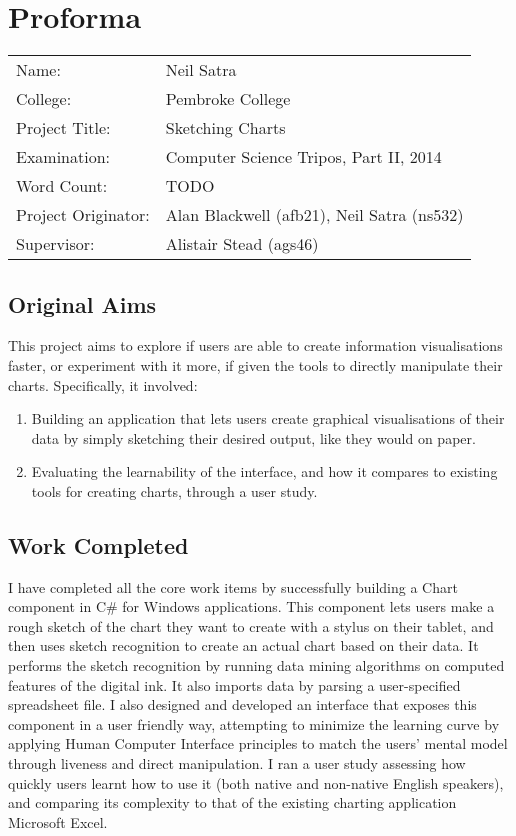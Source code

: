 \setcounter{page}{1}
\chapter*{Proforma}

\begin{tabular}{ll}
Name:               & Neil Satra					\\
College:            & Pembroke College				\\
Project Title:      & Sketching Charts				\\
Examination:        & Computer Science Tripos, Part II, 2014        \\
Word Count:         & TODO							\\
Project Originator: & Alan Blackwell (afb21), Neil Satra (ns532)        \\
Supervisor:         & Alistair Stead (ags46)				\\ 
\end{tabular}

\section*{Original Aims}
This project aims to explore if users are able to create information visualisations faster, or experiment with it more, if given the tools to directly manipulate their charts. Specifically, it involved:
\begin{enumerate}

	\item Building an application that lets users create graphical visualisations of their data by simply sketching their desired output, like they would on paper.

	\item Evaluating the learnability of the interface, and how it compares to existing tools for creating charts, through a user study.

\end{enumerate}

\section*{Work Completed}
I have completed all the core work items by successfully building a Chart component in C\# for Windows applications. This component lets users make a rough sketch of the chart they want to create with a stylus on their tablet, and then uses sketch recognition to create an actual chart based on their data. It performs the sketch recognition by running data mining algorithms on computed features of the digital ink. It also imports data by parsing a user-specified spreadsheet file. I also designed and developed an interface that exposes this component in a user friendly way, attempting to minimize the learning curve by applying Human Computer Interface principles to match the users' mental model through liveness and direct manipulation. I ran a user study assessing how quickly users learnt how to use it (both native and non-native English speakers), and comparing its complexity to that of the existing charting application Microsoft Excel.

